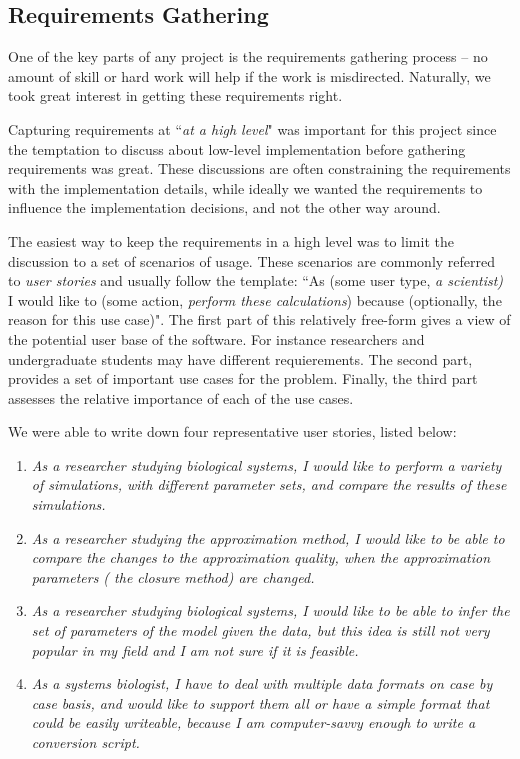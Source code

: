 \subsection{Requirements Gathering}
\label{sec:requirements-gathering}
One of the key parts of any project is the requirements gathering process -- no amount of skill or hard work will help if the work is misdirected.
Naturally, we took great interest in getting these requirements right.

Capturing requirements at ``\emph{at a high level}" was important for this project since the temptation to discuss about low-level implementation before gathering requirements was great.
These discussions are often constraining the requirements with the implementation details, while ideally we wanted the requirements to influence the implementation decisions, and not the other way around.

The easiest way to keep the requirements in a high level was to limit the discussion to a set of scenarios of usage.
These scenarios are commonly referred to \emph{user stories} and usually follow the template: ``As (some user type, \eg{} \emph{a scientist)} I would like to (some action, \eg{} \emph{perform these calculations}) because (optionally, the reason for this use case)".
The first part of this relatively free-form gives a view of the potential user base of the software.
For instance researchers and undergraduate students may have different requierements.
The second part, provides a set of important use cases for the problem.
Finally, the third part assesses the relative importance of each of the use cases.

We were able to write down four representative user stories, listed below:
\begin{enumerate}

    \item \emph{As a researcher studying biological systems, I would like to perform a variety of simulations, with different parameter sets, and compare the results of these simulations.}

    \item \emph{As a researcher studying the approximation method, I would like to be able to compare the changes to the approximation quality, when the approximation parameters (\ie{} the closure method) are changed.}

    \item \emph{As a researcher studying biological systems, I would like to be able to infer the set of parameters of the model given the data, but this idea is still not very popular in my field and I am not sure if it is feasible.}

    \item \emph{As a systems biologist, I have to deal with multiple data formats on case by case basis, and would like to support them all or have a simple format that could be easily writeable, because I am computer-savvy enough to write a conversion script.}
\end{enumerate}

